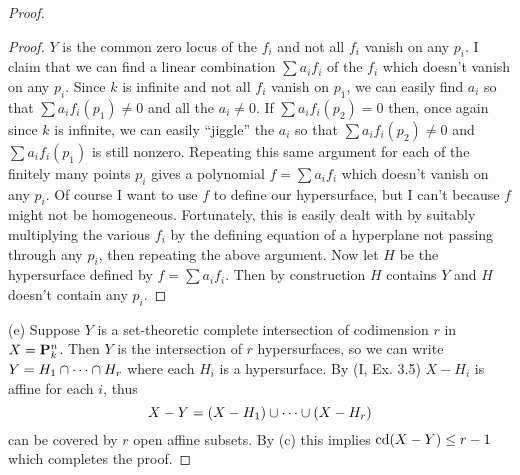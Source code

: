 \documentclass[12pt]{article}
\begin{document}
\begin{proof}
\begin{proof}
$Y$ is the common zero locus of the $f_i$ and not all $f_i$ vanish
on any $p_i$. I claim that we can find a linear combination
$\sum a_i f_i$ of the $f_i$ which doesn't vanish on any $p_i$. 
Since $k$ is infinite and not all $f_i$ vanish on $p_1$, 
we can easily find $a_i$ so that $\sum a_i f_i(p_1)\neq 0$ 
and all the $a_i\neq 0$. If $\sum a_i f_i(p_2)=0$ then,
once again since $k$ is infinite, we can easily ``jiggle''
the $a_i$ so that $\sum a_i f_i(p_2)\neq 0$ and 
$\sum a_i f_i(p_1)$ is still nonzero. Repeating this same
argument for each of the finitely many points $p_i$ gives
a polynomial $f=\sum a_i f_i$ which doesn't vanish on any $p_i$. 
Of course I want to use $f$ to define our
hypersurface, but I can't because $f$ might not be homogeneous. 
Fortunately, this is easily dealt with 
by suitably multiplying the various $f_i$ by the defining equation
of a hyperplane not passing through any $p_i$, then repeating the
above argument. Now let $H$ be the hypersurface defined by $f=\sum a_i f_i$.
Then by construction $H$ contains $Y$ and $H$ doesn't
contain any $p_i$. 
\end{proof}


(e) Suppose $Y$ is a set-theoretic complete intersection of codimension
$r$ in $X=\P_k^n$. Then $Y$ is the intersection of $r$ hypersurfaces,
so we can write $Y=H_1\intersect\cdots\intersect{}H_r$ where 
each $H_i$ is a hypersurface. By (I, Ex. 3.5) $X-H_i$ is affine for
each $i$, thus 
$$X-Y=(X-H_1)\union\cdots\union(X-H_r)$$
can be covered by $r$ open affine subsets. By (c) this
implies $\cd(X-Y)\leq r-1$ which completes the proof.  
\end{proof}
\end{document}
